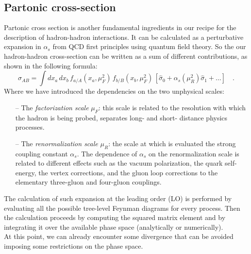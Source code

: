 %
%

\subsection{Partonic cross-section}

Partonic cross section is another fundamental ingredients in our recipe for the description of hadron-hadron interactions. It can be calculated as a perturbative expansion in $\alpha_s$ from QCD first principles using quantum field theory. So the our hadron-hadron cross-section can be written as a sum of different contributions, as shown in the following formula:
\begin{equation}
	\sigma_{AB}=\displaystyle\int dx_a\,dx_b\,f_{a/A}(x_a,\mu_F^2)\,f_{b/B}(x_b,\mu_F^2)\,\left[\hat{\sigma}_0+\alpha_s(\mu_R^2)\hat{\sigma}_1+\dots\right]\quad .
\label{eq:factorization3}
\end{equation}
Where we have introduced the dependencies on the two unphysical scales:
\begin{itemize}
	\item[--] The \textit{factorization scale} $\mu_F$: this scale is related to the resolution with which the hadron is being probed, separates long- and short- distance physics processes.
	\item[--] The \textit{renormalization scale} $\mu_R$: the scale at which is evaluated the strong coupling constant $\alpha_s$. The dependence of $\alpha_s$ on the renormalization scale is related to different effects such as  the vacuum polarization, the quark self-energy, the vertex corrections, and the gluon loop corrections to the elementary three-gluon and four-gluon couplings.
\end{itemize}

The calculation of such expansion at the leading order (LO) is performed by evaluating all the possible tree-level Feynman diagrams for every process. Then the calculation proceeds by computing the squared matrix element and by integrating it over the available phase space (analytically or numerically).
\\
At this point, we can already encounter some divergence that can be avoided imposing some  restrictions on the phase space.

